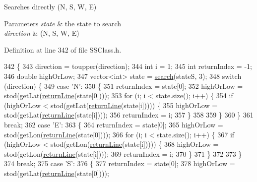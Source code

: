 Searches directly (N, S, W, E) 


\begin{DoxyParams}{Parameters}
{\em state} & the state to search \\
\hline
{\em direction} & (N, S, W, E) \\
\hline
\end{DoxyParams}


Definition at line 342 of file S\+S\+Class.\+h.


\begin{DoxyCode}
342                                                             \{
343     direction = toupper(direction);
344     \textcolor{keywordtype}{int} i = 1;
345     \textcolor{keywordtype}{int} returnIndex = -1;
346     \textcolor{keywordtype}{double} highOrLow;
347     vector<int> state = \hyperlink{classSSClass_a9df3598c000a6a5e9ef994d19196e69f}{search}(stateS, 3);
348     \textcolor{keywordflow}{switch} (direction) \{
349     \textcolor{keywordflow}{case} \textcolor{charliteral}{'N'}:
350     \{
351         returnIndex = state[0];
352         highOrLow = stod(getLat(\hyperlink{classSSClass_ab0a8ea1af895df28359b5733bd920ef3}{returnLine}(state[0])));
353         \textcolor{keywordflow}{for} (i; i < state.size(); i++) \{
354             \textcolor{keywordflow}{if} (highOrLow < stod(getLat(\hyperlink{classSSClass_ab0a8ea1af895df28359b5733bd920ef3}{returnLine}(state[i])))) \{
355                 highOrLow = stod(getLat(\hyperlink{classSSClass_ab0a8ea1af895df28359b5733bd920ef3}{returnLine}(state[i])));
356                 returnIndex = i;
357             \}
358 
359         \}
360     \}
361     \textcolor{keywordflow}{break};
362     \textcolor{keywordflow}{case} \textcolor{charliteral}{'E'}:
363     \{
364         returnIndex = state[0];
365         highOrLow = stod(getLon(\hyperlink{classSSClass_ab0a8ea1af895df28359b5733bd920ef3}{returnLine}(state[0])));
366         \textcolor{keywordflow}{for} (i; i < state.size(); i++) \{
367             \textcolor{keywordflow}{if} (highOrLow < stod(getLon(\hyperlink{classSSClass_ab0a8ea1af895df28359b5733bd920ef3}{returnLine}(state[i])))) \{
368                 highOrLow = stod(getLon(\hyperlink{classSSClass_ab0a8ea1af895df28359b5733bd920ef3}{returnLine}(state[i])));
369                 returnIndex = i;
370             \}
371         \}
372         
373     \}
374     \textcolor{keywordflow}{break};
375     \textcolor{keywordflow}{case} \textcolor{charliteral}{'S'}:
376     \{
377         returnIndex = state[0];
378         highOrLow = stod(getLat(\hyperlink{classSSClass_ab0a8ea1af895df28359b5733bd920ef3}{returnLine}(state[0])));

\end{DoxyCode}
